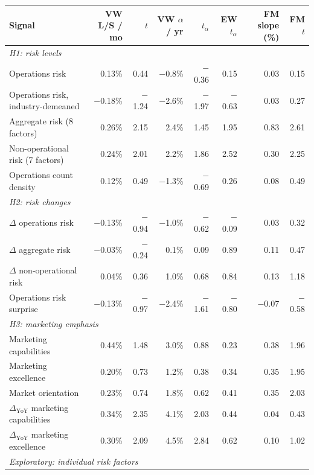 \begin{tabular}{lrrrrrrr}
\toprule
Signal & VW L/S / mo & $t$ & VW $\alpha$ / yr & $t_\alpha$ & EW $t_\alpha$ & FM slope (\%) & FM $t$ \\
\midrule
\multicolumn{8}{l}{\textit{H1: risk levels}} \\
Operations risk & 0.13\% & 0.44 & \ensuremath{-}0.8\% & \ensuremath{-}0.36 & 0.15 & 0.03 & 0.15 \\
Operations risk, industry-demeaned & \ensuremath{-}0.18\% & \ensuremath{-}1.24 & \ensuremath{-}2.6\% & \ensuremath{-}1.97 & \ensuremath{-}0.63 & 0.03 & 0.27 \\
Aggregate risk (8 factors) & 0.26\% & 2.15 & 2.4\% & 1.45 & 1.95 & 0.83 & 2.61 \\
Non-operational risk (7 factors) & 0.24\% & 2.01 & 2.2\% & 1.86 & 2.52 & 0.30 & 2.25 \\
Operations count density & 0.12\% & 0.49 & \ensuremath{-}1.3\% & \ensuremath{-}0.69 & 0.26 & 0.08 & 0.49 \\
\midrule
\multicolumn{8}{l}{\textit{H2: risk changes}} \\
$\Delta$ operations risk & \ensuremath{-}0.13\% & \ensuremath{-}0.94 & \ensuremath{-}1.0\% & \ensuremath{-}0.62 & \ensuremath{-}0.09 & 0.03 & 0.32 \\
$\Delta$ aggregate risk & \ensuremath{-}0.03\% & \ensuremath{-}0.24 & 0.1\% & 0.09 & 0.89 & 0.11 & 0.47 \\
$\Delta$ non-operational risk & 0.04\% & 0.36 & 1.0\% & 0.68 & 0.84 & 0.13 & 1.18 \\
Operations risk surprise & \ensuremath{-}0.13\% & \ensuremath{-}0.97 & \ensuremath{-}2.4\% & \ensuremath{-}1.61 & \ensuremath{-}0.80 & \ensuremath{-}0.07 & \ensuremath{-}0.58 \\
\midrule
\multicolumn{8}{l}{\textit{H3: marketing emphasis}} \\
Marketing capabilities & 0.44\% & 1.48 & 3.0\% & 0.88 & 0.23 & 0.38 & 1.96 \\
Marketing excellence & 0.20\% & 0.73 & 1.2\% & 0.38 & 0.34 & 0.35 & 1.95 \\
Market orientation & 0.23\% & 0.74 & 1.8\% & 0.62 & 0.41 & 0.35 & 2.03 \\
$\Delta_{\text{YoY}}$ marketing capabilities & 0.34\% & 2.35 & 4.1\% & 2.03 & 0.44 & 0.04 & 0.43 \\
$\Delta_{\text{YoY}}$ marketing excellence & 0.30\% & 2.09 & 4.5\% & 2.84 & 0.62 & 0.10 & 1.02 \\
\midrule
\multicolumn{8}{l}{\textit{Exploratory: individual risk factors}} \\

\end{tabular}
